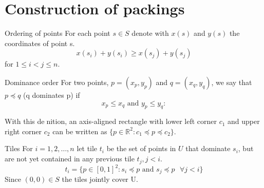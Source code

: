 \section{Construction of packings}
\begin{frame}{Ordering of points}
	For each point $s \in S$ denote with $x(s)$ and $y(s)$ the coordinates of point s.
	\begin{equation*}
		x(s_i) + y(s_i) \geq x(s_j) + y(s_j)
	\end{equation*}
	for $1 \leq i < j \leq n$.
\end{frame}

\iffalse
{ %
    \setbeamertemplate{navigation symbols}{}
    \begin{frame}<article:0>[plain]
        \begin{tikzpicture}[remember picture,overlay]
            \node[at=(current page.center)] {
                \animategraphics[autoplay,width=\paperwidth]{30}{../media/images/scenes/SweepingLine}{0000}{0277}
            };
        \end{tikzpicture}
     \end{frame}
}

{ %
    \setbeamertemplate{navigation symbols}{}
    \begin{frame}<article:0>[plain]
        \begin{tikzpicture}[remember picture,overlay]
            \node[at=(current page.center)] {
                \animategraphics[autoplay,width=\paperwidth]{30}{../media/images/scenes/GreedyPacking}{0000}{0490}
            };
        \end{tikzpicture}
     \end{frame}
}
\fi

\begin{frame}{Dominance order}
	For two points, $p = (x_p, y_p)$ and $q = (x_q, y_q)$, we say that $p \preceq q$ (q dominates p) if
	\begin{equation*}
		x_p \leq x_q \text{ and } y_p \leq y_q:
	\end{equation*}

	With this denition, an axis-aligned rectangle with lower left corner $c_1$ and upper right corner $c_2$ can be written as $\{p \in \mathbb{R}^2 : c_1 \preceq p \preceq c_2\}$.
\end{frame}

\begin{frame}{Tiles}
	For $i = 1, 2, \ldots, n$ let tile $t_i$ be the set of points in $U$ that dominate $s_i$, but are not yet contained in any previous tile $t_j, j < i$.
	\begin{equation*}
		t_i = \{p \in [0,1]^2: s_i \preceq p \text{ and } s_j \preceq p\text{ } \forall j < i\}
	\end{equation*}
	Since $(0, 0) \in S$ the tiles jointly cover U.
\end{frame}

